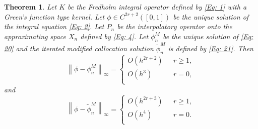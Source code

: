 \documentclass[sn-mathphys-num]{sn-jnl}%
\theoremstyle{thmstyleone}%
\newtheorem{theorem}{Theorem}%
\theoremstyle{thmstyletwo}%
\theoremstyle{thmstylethree}%
\newcommand{\norm}[1]{\left\lVert #1\right\rVert}
\begin{document}
\begin{theorem} \label{t5}
	Let $K$ be the Fredholm integral operator defined by \eqref{Eq: 1} with a Green's function type kernel. Let $\phi \in C^{2r+2}([0,1])$ be the unique solution of the integral equation  \eqref{Eq: 2}. Let $P_n$ be the interpolatory operator onto the approximating space $X_n$ defined by \eqref{Eq: 4}. Let $\phi_n^M$ be the unique solution of \eqref{Eq: 20} and the iterated modified collocation solution $\tilde{\phi}_n^M$ is defined by \eqref{Eq: 21}. Then
	\begin{equation*}
		\norm{\phi - \phi_n^M }_\infty =
		\begin{cases}
			O\left(h^{2r + 2}\right)~~~          &  r \ge 1,\\
			O\left(h^{3}\right)~~~          & r=0,\\
		\end{cases} 
	\end{equation*}
	and
	\begin{equation*}
		\norm{\phi - \tilde{\phi}_n^M }_\infty =
		\begin{cases}
			O\left(h^{2r + 3}\right)~~~          &  r \ge 1,\\
			O\left(h^{4}\right)~~~          & r=0.\\
		\end{cases} 
	\end{equation*}
\end{theorem}
\end{document}
